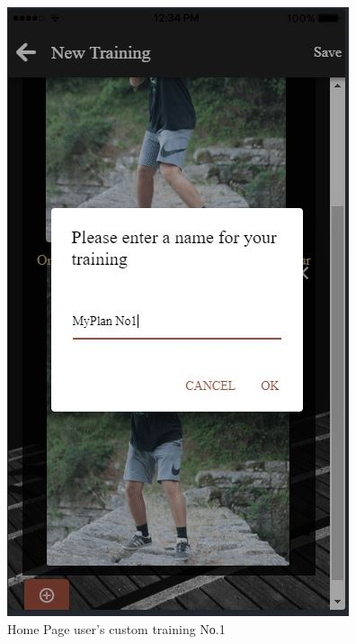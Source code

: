 \documentclass[a4paper,12pt]{article}
\begin{document}
			\begin{figure}[!htb]
				\caption{Home Page user's custom training Νο.1}
				\vspace*{0.5cm}

				  \includegraphics[width=\linewidth]{plan5}
				  

\end{figure}
\end{document}
